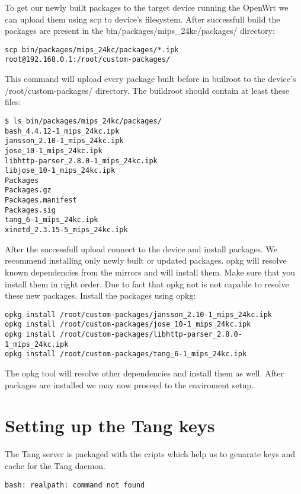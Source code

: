 To get our newly built packages to the target device running the OpenWrt we can upload them using scp to device's filesystem.
After successfull build the packages are present in the bin/packages/mips\_24kc/packages/ directory:
\begin{lstlisting}[columns=fixed,basicstyle=\ttfamily\footnotesize,tabsize=4,backgroundcolor=\color{yellow!10}]
scp bin/packages/mips_24kc/packages/*.ipk root@192.168.0.1:/root/custom-packages/
\end{lstlisting}
This command will upload every package built before in builroot to the device's /root/custom-packages/ directory.
The buildroot should contain at least these files:
\begin{lstlisting}[columns=fixed,basicstyle=\ttfamily\footnotesize,tabsize=4,backgroundcolor=\color{yellow!10}]
$ ls bin/packages/mips_24kc/packages/
bash_4.4.12-1_mips_24kc.ipk
jansson_2.10-1_mips_24kc.ipk
jose_10-1_mips_24kc.ipk
libhttp-parser_2.8.0-1_mips_24kc.ipk
libjose_10-1_mips_24kc.ipk
Packages
Packages.gz
Packages.manifest
Packages.sig
tang_6-1_mips_24kc.ipk
xinetd_2.3.15-5_mips_24kc.ipk
\end{lstlisting}
After the successfull upload connect to the device and install packages.
We recommend installing only newly built or updated packages.
opkg will resolve known dependencies from the mirrors and will install them.
Make sure that you install them in right order.
Due to fact that opkg not is not capable to resolve these new packages.
Install the packages using opkg:
\begin{lstlisting}[columns=fixed,basicstyle=\ttfamily\footnotesize,tabsize=4,backgroundcolor=\color{yellow!10}]
opkg install /root/custom-packages/jansson_2.10-1_mips_24kc.ipk
opkg install /root/custom-packages/jose_10-1_mips_24kc.ipk
opkg install /root/custom-packages/libhttp-parser_2.8.0-1_mips_24kc.ipk
opkg install /root/custom-packages/tang_6-1_mips_24kc.ipk
\end{lstlisting}
The opkg tool will resolve other dependencies and install them as well.
After packages are installed we may now proceed to the enviroment setup.



\section{Setting up the Tang keys}
The Tang server is packaged with the cripts which help us to genarate keys and cache for the Tang daemon.

\begin{lstlisting}[columns=fixed,basicstyle=\ttfamily\footnotesize,tabsize=4,backgroundcolor=\color{yellow!10}]
bash: realpath: command not found
\end{lstlisting}

